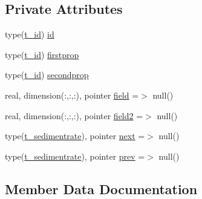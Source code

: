 \subsection*{Private Attributes}
\begin{DoxyCompactItemize}
\item 
type(\mbox{\hyperlink{structmodulesedimentproperties_1_1t__id}{t\+\_\+id}}) \mbox{\hyperlink{structmodulesedimentproperties_1_1t__sedimentrate_a763f0bfbb17ed68245576f9841e44c74}{id}}
\item 
type(\mbox{\hyperlink{structmodulesedimentproperties_1_1t__id}{t\+\_\+id}}) \mbox{\hyperlink{structmodulesedimentproperties_1_1t__sedimentrate_afc66ac5c366d6f268da96cb8c866d272}{firstprop}}
\item 
type(\mbox{\hyperlink{structmodulesedimentproperties_1_1t__id}{t\+\_\+id}}) \mbox{\hyperlink{structmodulesedimentproperties_1_1t__sedimentrate_a9baafbed30242e1add64b2a4c8fc61ff}{secondprop}}
\item 
real, dimension(\+:,\+:,\+:), pointer \mbox{\hyperlink{structmodulesedimentproperties_1_1t__sedimentrate_a420bbea23e97b992b5f34bfe0d65b177}{field}} =$>$ null()
\item 
real, dimension(\+:,\+:,\+:), pointer \mbox{\hyperlink{structmodulesedimentproperties_1_1t__sedimentrate_a3b3531c16b14a71a78220a4ec9262094}{field2}} =$>$ null()
\item 
type(\mbox{\hyperlink{structmodulesedimentproperties_1_1t__sedimentrate}{t\+\_\+sedimentrate}}), pointer \mbox{\hyperlink{structmodulesedimentproperties_1_1t__sedimentrate_a9d71bd9ef485ef7b6bc10c5324d41335}{next}} =$>$ null()
\item 
type(\mbox{\hyperlink{structmodulesedimentproperties_1_1t__sedimentrate}{t\+\_\+sedimentrate}}), pointer \mbox{\hyperlink{structmodulesedimentproperties_1_1t__sedimentrate_a0f3b797e3ffc4aba6f593507c194e875}{prev}} =$>$ null()
\end{DoxyCompactItemize}


\subsection{Member Data Documentation}
\mbox{\label{structmodulesedimentproperties_1_1t__sedimentrate_a420bbea23e97b992b5f34bfe0d65b177}} 
